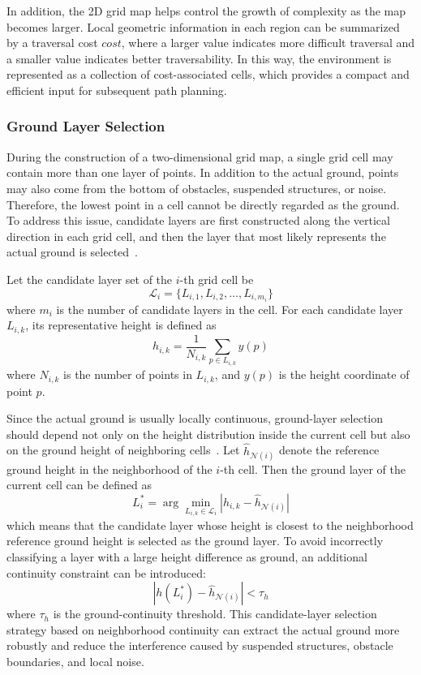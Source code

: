 \documentclass[12pt]{interim_report}
\begin{document}
In addition, the 2D grid map helps control the growth of complexity as the map becomes larger. Local geometric information in each region can be summarized by a traversal cost \(cost\), where a larger value indicates more difficult traversal and a smaller value indicates better traversability. In this way, the environment is represented as a collection of cost-associated cells, which provides a compact and efficient input for subsequent path planning.

\subsubsection{Ground Layer Selection}

During the construction of a two-dimensional grid map, a single grid cell may contain more than one layer of points. In addition to the actual ground, points may also come from the bottom of obstacles, suspended structures, or noise. Therefore, the lowest point in a cell cannot be directly regarded as the ground. To address this issue, candidate layers are first constructed along the vertical direction in each grid cell, and then the layer that most likely represents the actual ground is selected~\cite{meng2018terrain}.

Let the candidate layer set of the \(i\)-th grid cell be
\[
\mathcal{L}_i = \{L_{i,1}, L_{i,2}, \dots, L_{i,m_i}\}
\]
where \(m_i\) is the number of candidate layers in the cell. For each candidate layer \(L_{i,k}\), its representative height is defined as
\[
h_{i,k} = \frac{1}{N_{i,k}} \sum_{p \in L_{i,k}} y(p)
\]
where \(N_{i,k}\) is the number of points in \(L_{i,k}\), and \(y(p)\) is the height coordinate of point \(p\).

Since the actual ground is usually locally continuous, ground-layer selection should depend not only on the height distribution inside the current cell but also on the ground height of neighboring cells~\cite{meng2018terrain,gu2008traversability}. Let \(\hat{h}_{\mathcal{N}(i)}\) denote the reference ground height in the neighborhood of the \(i\)-th cell. Then the ground layer of the current cell can be defined as
\[
L_i^\ast = \arg\min_{L_{i,k} \in \mathcal{L}_i}
\left| h_{i,k} - \hat{h}_{\mathcal{N}(i)} \right|
\]
which means that the candidate layer whose height is closest to the neighborhood reference ground height is selected as the ground layer. To avoid incorrectly classifying a layer with a large height difference as ground, an additional continuity constraint can be introduced:
\[
\left| h(L_i^\ast) - \hat{h}_{\mathcal{N}(i)} \right| < \tau_h
\]
where \(\tau_h\) is the ground-continuity threshold. This candidate-layer selection strategy based on neighborhood continuity can extract the actual ground more robustly and reduce the interference caused by suspended structures, obstacle boundaries, and local noise.
\end{document}
